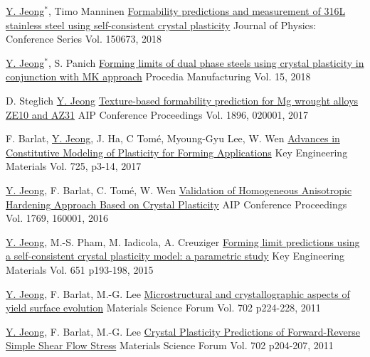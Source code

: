 \begin{cventries}
\item
    \cventry
  {\underline{Y. Jeong}$^*$, Timo Manninen}
  {\href{http://iopscience.iop.org/article/10.1088/1742-6596/1063/1/012020}{Formability predictions and measurement of 316L stainless steel using self-consistent crystal plasticity}}
  {Journal of Physics: Conference Series}
  {Vol. 150673, 2018}
  {
  }

  \cventry
  {\underline{Y. Jeong}$^*$, S. Panich}
  {\href{https://doi.org/10.1016/j.promfg.2018.07.209}{Forming limits of dual phase steels using crystal plasticity in conjunction with MK approach}}
  {Procedia Manufacturing}
  {Vol. 15, 2018}
  {
  }

  \cventry
  {D. Steglich \underline{Y. Jeong}}
  {\href{https://doi.org/10.1063/1.5007958}{Texture-based formability prediction for Mg wrought alloys ZE10 and AZ31}}
  {AIP Conference Proceedings}
  {Vol. 1896, 020001, 2017}
  {
  }

  \cventry
  {F. Barlat, \underline{Y. Jeong}, J. Ha, C Tom\'{e}, Myoung-Gyu Lee, W. Wen}
  {\href{https://dx.doi.org/10.4028/www.scientific.net/KEM.725.3}{Advances in Constitutive Modeling of Plasticity for Forming Applications}}
  {Key Engineering Materials}
  {Vol. 725, p3-14, 2017}
  {
  }

  \cventry
  {\underline{Y. Jeong}, F. Barlat, C. Tom\'{e}, W. Wen}
  {\href{http://dx.doi.org/10.1063/1.4963544}{Validation of Homogeneous Anisotropic Hardening Approach Based on Crystal Plasticity}}
  {AIP Conference Proceedings}
  {Vol. 1769, 160001, 2016}
  {
  }


  \cventry
  {\underline{Y. Jeong}, M.-S. Pham, M. Iadicola, A. Creuziger}
  {\href{https://doi.org/10.4028/www.scientific.net/KEM.651-653.193}{Forming limit predictions using a self-consistent crystal plasticity model: a parametric study}}
  {Key Engineering Materials}
  {Vol. 651 p193-198, 2015  }
  {
  }


  \cventry
  {\underline{Y. Jeong}, F. Barlat, M.-G. Lee}
  {\href{https://doi.org/10.4028/www.scientific.net/MSF.702-703.224}{Microstructural and crystallographic aspects of yield surface evolution}}
  {Materials Science Forum}
  {Vol. 702 p224-228, 2011}
  {
  }

  \cventry
  {\underline{Y. Jeong}, F. Barlat, M.-G. Lee}
  {\href{https://doi.org/10.4028/www.scientific.net/MSF.702-703.204}{Crystal Plasticity Predictions of Forward-Reverse Simple Shear Flow Stress}}
  {Materials Science Forum}
  {Vol. 702 p204-207, 2011}
  {
  }
\item

\end{cventries}
